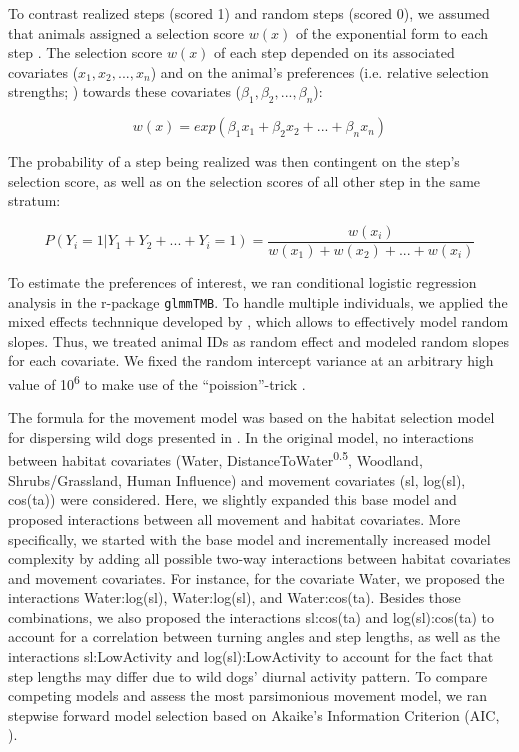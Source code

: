\documentclass[abstract=on,10pt,a4paper,bibliography=totocnumbered]{article}
\begin{document}
To contrast realized steps (scored 1) and random steps (scored 0), we assumed
that animals assigned a selection score \(w(x)\) of the exponential form to each
step \citep{Fortin.2005}. The selection score \(w(x)\) of each step depended on
its associated covariates (\(x_1, x_2, ..., x_n\)) and on the animal's
preferences (i.e. relative selection strengths; \citealp{Avgar.2017}) towards
these covariates (\(\beta_1, \beta_2, ..., \beta_n\)):

\begin{equation}
\label{EQ1}
  w(x) = exp(\beta_1 x_1 + \beta_2 x_2 + ... + \beta_n x_n)
\end{equation}

The probability of a step being realized was then contingent on the step's
selection score, as well as on the selection scores of all other step in the
same stratum:

\begin{equation}
\label{EQ2}
  P(Y_{i} = 1 | Y_{1} + Y_{2} + ... + Y_{i} = 1) =
  \frac{w(x_{i})}{w(x_{1}) + w(x_{2}) + ... + w(x_{i})}
\end{equation}

To estimate the preferences of interest, we ran conditional logistic regression
analysis in the r-package {\tt glmmTMB}. To handle multiple individuals, we
applied the mixed effects technnique developed by \citep{Muff.2020}, which
allows to effectively model random slopes. Thus, we treated animal IDs as random
effect and modeled random slopes for each covariate. We fixed the random
intercept variance at an arbitrary high value of 10\textsuperscript{6} to make
use of the  ``poission''-trick \citep{Muff.2020}.

The formula for the movement model was based on the habitat selection model for
dispersing wild dogs presented in \cite{Hofmann.2021}. In the original model, no
interactions between habitat covariates (\textsf{Water,
DistanceToWater\textsuperscript{0.5}, Woodland, Shrubs/Grassland, Human
Influence}) and movement covariates (\textsf{sl, log(sl), cos(ta)}) were
considered. Here, we slightly expanded this base model and proposed interactions
between all movement and habitat covariates. More specifically, we started with
the base model and incrementally increased model complexity by adding all
possible two-way interactions between habitat covariates and movement
covariates. For instance, for the covariate \textsf{Water}, we proposed the
interactions \textsf{Water:log(sl)}, \textsf{Water:log(sl)}, and
\textsf{Water:cos(ta)}. Besides those combinations, we also proposed the
interactions \textsf{sl:cos(ta)} and \textsf{log(sl):cos(ta)} to account for a
correlation between turning angles and step lengths, as well as the interactions
\textsf{sl:LowActivity} and \textsf{log(sl):LowActivity} to account for the fact
that step lengths may differ due to wild dogs' diurnal activity pattern. To
compare competing models and assess the most parsimonious movement model, we ran
stepwise forward model selection based on Akaike's Information Criterion (AIC,
\citealp{Burnham.2002}).
\end{document}
